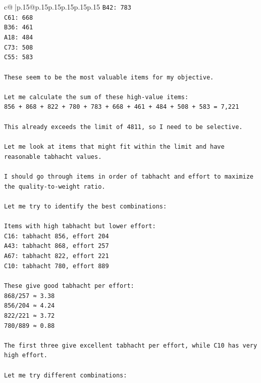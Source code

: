 \documentclass{article}
\begin{document}
{\begin{supertabular}{c@{$\;$}|p{.15\linewidth}@{}p{.15\linewidth}p{.15\linewidth}p{.15\linewidth}p{.15\linewidth}p{.15\linewidth}}
{{{\texttt{B42: 783} \\
\texttt{C61: 668} \\
\texttt{B36: 461} \\
\texttt{A18: 484} \\
\texttt{C73: 508} \\
\texttt{C55: 583} \\
\\ 
\texttt{These seem to be the most valuable items for my objective.} \\
\\ 
\texttt{Let me calculate the sum of these high{-}value items:} \\
\texttt{856 + 868 + 822 + 780 + 783 + 668 + 461 + 484 + 508 + 583 = 7,221} \\
\\ 
\texttt{This already exceeds the limit of 4811, so I need to be selective.} \\
\\ 
\texttt{Let me look at items that might fit within the limit and have reasonable tabhacht values.} \\
\\ 
\texttt{I should go through items in order of tabhacht and effort to maximize the quality{-}to{-}weight ratio.} \\
\\ 
\texttt{Let me try to identify the best combinations:} \\
\\ 
\texttt{Items with high tabhacht but lower effort:} \\
\texttt{C16: tabhacht 856, effort 204} \\
\texttt{A43: tabhacht 868, effort 257} \\
\texttt{A67: tabhacht 822, effort 221} \\
\texttt{C10: tabhacht 780, effort 889} \\
\\ 
\texttt{These give good tabhacht per effort:} \\
\texttt{868/257 ≈ 3.38} \\
\texttt{856/204 ≈ 4.24} \\
\texttt{822/221 ≈ 3.72} \\
\texttt{780/889 ≈ 0.88} \\
\\ 
\texttt{The first three give excellent tabhacht per effort, while C10 has very high effort.} \\
\\ 
\texttt{Let me try different combinations:} \\
}}}
\end{supertabular}}
\end{document}
